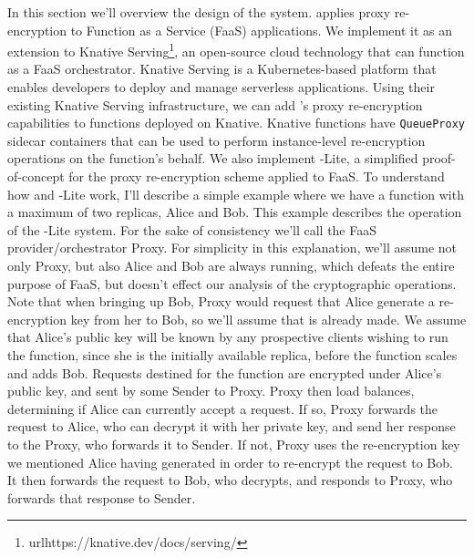 
In this section we'll overview the design of the \SystemName system.
\SystemName applies proxy re-encryption to Function as a Service (FaaS) applications.
%
We implement it as an extension to Knative Serving\footnote{url{https://knative.dev/docs/serving/}}, an open-source cloud technology that can function as a FaaS orchestrator.
%
Knative Serving is a Kubernetes-based platform that enables developers to deploy and manage serverless applications.
%
Using their existing Knative Serving infrastructure, we can add \SystemName's proxy re-encryption capabilities to functions deployed on Knative.
%
Knative functions have \texttt{QueueProxy} sidecar containers that can be used to perform instance-level re-encryption operations on the function's behalf.
%
We also implement \SystemName-Lite, a simplified proof-of-concept for the proxy re-encryption scheme applied to FaaS.
%
To understand how \SystemName and \SystemName-Lite work, I'll describe a simple example where we have a function with a maximum of two replicas, Alice and Bob.
This example describes the operation of the \SystemName-Lite system.
For the sake of consistency we'll call the FaaS provider/orchestrator Proxy.
For simplicity in this explanation, we'll assume not only Proxy, but also Alice and Bob are always running, which defeats the entire purpose of FaaS, but doesn't effect our analysis of the cryptographic operations.
Note that when bringing up Bob, Proxy would request that Alice generate a re-encryption key from her to Bob, so we'll assume that is already made.
We assume that Alice's public key will be known by any prospective clients wishing to run the function, since she is the initially available replica, before the function scales and adds Bob.
Requests destined for the function are encrypted under Alice's public key, and sent by some Sender to Proxy.
Proxy then load balances, determining if Alice can currently accept a request.
If so, Proxy forwards the request to Alice, who can decrypt it with her private key, and send her response to the Proxy, who forwards it to Sender.
If not, Proxy uses the re-encryption key we mentioned Alice having generated in order to re-encrypt the request to Bob.
It then forwards the request to Bob, who decrypts, and responds to  Proxy, who forwards that response to Sender.

